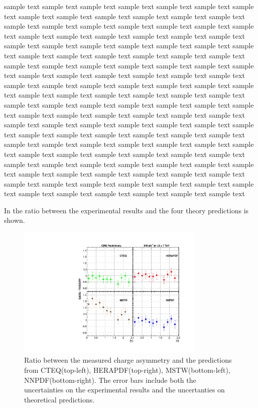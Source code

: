 sample text sample text sample text sample text sample text sample text sample
text sample text sample text sample text sample text sample text sample text
sample text sample text sample text sample text sample text sample text sample
text sample text sample text sample text sample text sample text sample text
sample text sample text sample text sample text sample text sample text sample
text sample text sample text sample text sample text sample text sample text
sample text sample text sample text sample text sample text sample text sample
text sample text sample text sample text sample text sample text sample text
sample text sample text sample text sample text sample text sample text sample
text sample text sample text sample text sample text sample text sample text
sample text sample text sample text sample text sample text sample text sample
text sample text sample text sample text sample text sample text sample text
sample text sample text sample text sample text sample text sample text sample
text sample text sample text sample text sample text sample text sample text
sample text sample text sample text sample text sample text sample text sample
text sample text sample text sample text sample text sample text sample text
sample text sample text sample text sample text sample text sample text sample
text sample text sample text sample text sample text sample text sample text
sample text sample text sample text sample text sample text sample text sample
text sample text sample text sample text sample text sample text sample text

In  the ratio between the experimental results and the four theory predictions is shown.

\begin{figure}[htb]
  \begin{center}
\includegraphics*[width=0.80\textwidth]{plotCarino}
  \caption{\label{fig:resFitRatio} Ratio between the measured charge asymmetry and the predictions from CTEQ(top-left), HERAPDF(top-right), MSTW(bottom-left), NNPDF(bottom-right). The error bars include both the uncertainties on the experimental results and the uncertanties on theoretical predictions.}
  \end{center}
\end{figure}

